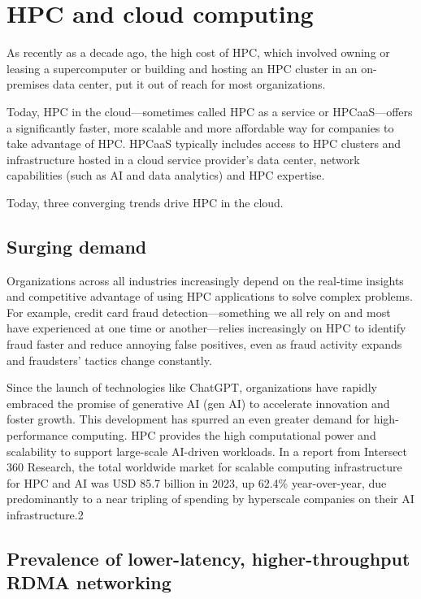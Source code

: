 \documentclass[11pt]{article}
\begin{document}
\section{HPC and cloud computing}

As recently as a decade ago, the high cost of HPC, which involved owning or leasing a supercomputer or building and hosting an HPC cluster in an on-premises data center, put it out of reach for most organizations.

Today, HPC in the cloud—sometimes called HPC as a service or HPCaaS—offers a significantly faster, more scalable and more affordable way for companies to take advantage of HPC. HPCaaS typically includes access to HPC clusters and infrastructure hosted in a cloud service provider's data center, network capabilities (such as AI and data analytics) and HPC expertise.

Today, three converging trends drive HPC in the cloud.

\subsection{Surging demand}

Organizations across all industries increasingly depend on the real-time insights and competitive advantage of using HPC applications to solve complex problems. For example, credit card fraud detection—something we all rely on and most have experienced at one time or another—relies increasingly on HPC to identify fraud faster and reduce annoying false positives, even as fraud activity expands and fraudsters' tactics change constantly.

Since the launch of technologies like ChatGPT, organizations have rapidly embraced the promise of generative AI (gen AI) to accelerate innovation and foster growth. This development has spurred an even greater demand for high-performance computing. HPC provides the high computational power and scalability to support large-scale AI-driven workloads. In a report from Intersect 360 Research, the total worldwide market for scalable computing infrastructure for HPC and AI was USD 85.7 billion in 2023, up 62.4\% year-over-year, due predominantly to a near tripling of spending by hyperscale companies on their AI infrastructure.2

\subsection{Prevalence of lower-latency, higher-throughput RDMA networking}
\end{document}
